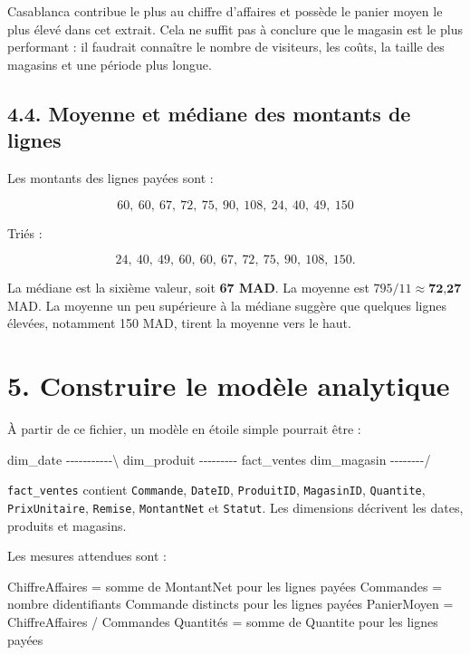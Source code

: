 \documentclass[
  french,
  letterpaper,
  open=any]{scrbook}
\newenvironment{Shaded}{\begin{snugshade}}{\end{snugshade}}
\newcommand{\NormalTok}[1]{\textcolor[rgb]{0.00,0.23,0.31}{#1}}
\theoremstyle{definition}
\theoremstyle{definition}
\theoremstyle{remark}
\begin{document}
Casablanca contribue le plus au chiffre d'affaires et possède le panier
moyen le plus élevé dans cet extrait. Cela ne suffit pas à conclure que
le magasin est le plus performant : il faudrait connaître le nombre de
visiteurs, les coûts, la taille des magasins et une période plus longue.

\subsection{4.4. Moyenne et médiane des montants de
lignes}\label{moyenne-et-muxe9diane-des-montants-de-lignes}

Les montants des lignes payées sont :

\[60,\ 60,\ 67,\ 72,\ 75,\ 90,\ 108,\ 24,\ 40,\ 49,\ 150\]

Triés :

\[24,\ 40,\ 49,\ 60,\ 60,\ 67,\ 72,\ 75,\ 90,\ 108,\ 150.\]

La médiane est la sixième valeur, soit \textbf{67 MAD}. La moyenne est
\(795/11 \approx \textbf{72,27}\) MAD. La moyenne un peu supérieure à la
médiane suggère que quelques lignes élevées, notamment 150 MAD, tirent
la moyenne vers le haut.

\section{5. Construire le modèle
analytique}\label{construire-le-moduxe8le-analytique}

À partir de ce fichier, un modèle en étoile simple pourrait être :

\begin{Shaded}
\begin{Highlighting}[]
\NormalTok{dim\_date {-}{-}{-}{-}{-}{-}{-}{-}{-}{-}{-}\textbackslash{}}
\NormalTok{dim\_produit {-}{-}{-}{-}{-}{-}{-}{-}{-} fact\_ventes}
\NormalTok{dim\_magasin {-}{-}{-}{-}{-}{-}{-}{-}/}
\end{Highlighting}
\end{Shaded}

\texttt{fact\_ventes} contient \texttt{Commande}, \texttt{DateID},
\texttt{ProduitID}, \texttt{MagasinID}, \texttt{Quantite},
\texttt{PrixUnitaire}, \texttt{Remise}, \texttt{MontantNet} et
\texttt{Statut}. Les dimensions décrivent les dates, produits et
magasins.

Les mesures attendues sont :

\begin{Shaded}
\begin{Highlighting}[]
\NormalTok{ChiffreAffaires = somme de MontantNet pour les lignes payées}
\NormalTok{Commandes = nombre d\textquotesingle{}identifiants Commande distincts pour les lignes payées}
\NormalTok{PanierMoyen = ChiffreAffaires / Commandes}
\NormalTok{Quantités = somme de Quantite pour les lignes payées}
\end{Highlighting}
\end{Shaded}
\end{document}
